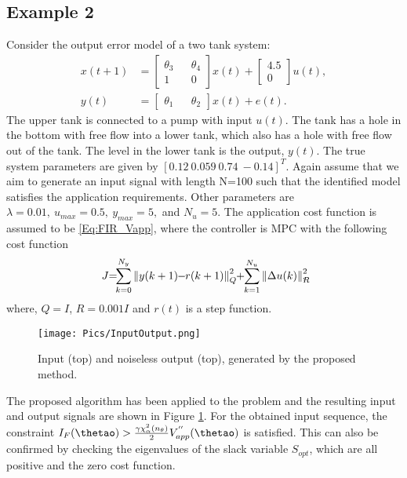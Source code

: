 \documentclass{ifacconf}
\begin{document}
\subsection{Example 2}
Consider the output error model of a two tank system:
\begin{equation}
\begin{split}
x(t+1) &= 
\begin{bmatrix}
\theta_3 && \theta_4\\
1           &&     0     
\end{bmatrix}
x(t) +
\begin{bmatrix}
4.5 \\
0        
\end{bmatrix}
u(t) ,\\
y(t) &= 
\begin{bmatrix}
\theta_1 &&  \theta_2
\end{bmatrix}
x(t) + e(t).
\end{split}
\end{equation}
The upper tank is connected to a pump with input $u(t)$. The tank has a hole in the bottom with free flow into a lower tank, which also has a hole with free flow out of the tank. The level in the lower tank is the output, $y(t)$. The true system parameters are given by $[0.12 \ 0.059 \ 0.74 \ -0.14]^T$. Again assume that we aim to generate an input signal with length N=100 such that the identified model satisfies the application requirements. Other parameters are 
$\lambda  =  0.01 		, \
u_{max} 	= 0.5		, \
y_{max} 	= 5		,$ and
$N_u 		= 5			$.
The application cost function is assumed to be \eqref{Eq:FIR_Vapp}, where the controller is MPC with the following cost function
\begin{equation}J\hspace{-0.1cm} =
															\hspace{-0.15cm}\sum^{N_y}_{k=0}\left\|y(k+1)  \hspace{-0.1cm}-\hspace{-0.1cm}  r(k+1)\right\|^{2}_{Q}\hspace{-0.1cm}
															+\hspace{-0.1cm}\sum^{N_u}_{k=1}\left\|\Delta u(k)\right\|^{2}_{R} \hspace{-0.3cm},
\end{equation}
where, $Q = I$, $R=0.001I$ and $r(t)$ is a step function.
\begin{figure}[ht]
      \centering
     \texttt{[image: Pics/InputOutput.png]}
      \caption{Input (top) and noiseless output (top), generated by the proposed method.} 
      \label{Figure:IO}
\end{figure}
The proposed algorithm has been applied to the problem and the resulting input and output signals are shown in Figure \ref{Figure:IO}. For the obtained input sequence, the constraint $I_F(\thetao) > \frac{\gamma \chi^2_\alpha(n_\theta)}{2}V^{''}_{app}(\thetao)$ is satisfied.
This can also be confirmed by checking the eigenvalues of the slack variable $S_{opt}$, which are all positive and the zero cost function.
\end{document}
